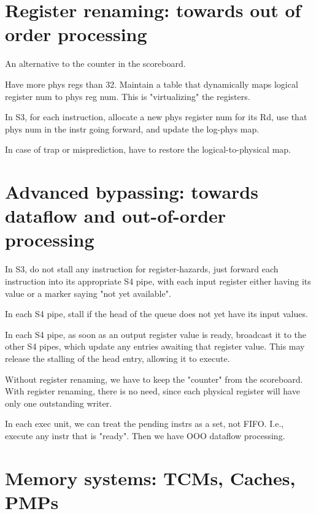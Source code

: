 \section{Register renaming: towards out of order processing}

An alternative to the counter in the scoreboard.

Have more phys regs than 32.  Maintain a table that dynamically maps
logical register num to phys reg num.  This is "virtualizing" the
registers.

In S3, for each instruction, allocate a new phys register num for its
Rd, use that phys num in the instr going forward, and update the
log-phys map.

In case of trap or misprediction, have to restore the logical-to-physical map.


\section{Advanced bypassing: towards dataflow and out-of-order processing}

In S3, do not stall any instruction for register-hazards, just forward
each instruction into its appropriate S4 pipe, with each input
register either having its value or a marker saying "not yet available".

In each S4 pipe, stall if the head of the queue does not yet have its
input values.

In each S4 pipe, as soon as an output register value is ready,
broadcast it to the other S4 pipes, which update any entries awaiting
that register value.  This may release the stalling of the head entry,
allowing it to execute.

Without register renaming, we have to keep the "counter" from the
scoreboard.  With register renaming, there is no need, since each
physical register will have only one outstanding writer.

In each exec unit, we can treat the pending instrs as a set, not FIFO.
I.e., execute any instr that is "ready".  Then we have OOO dataflow
processing.


\section{Memory systems: TCMs, Caches, PMPs}

